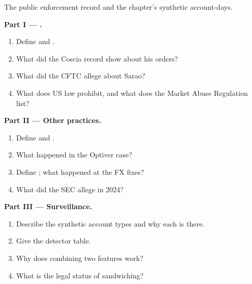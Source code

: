 \begin{problem}\label{pb:s2:manipulative-strategies-and-how-they-are-caught:1}
The public enforcement record and the chapter's synthetic account-days.

\medskip\noindent\textbf{Part I --- .}
\begin{enumerate}
\item Define  and .
\item What did the Coscia record show about his orders?
\item What did the CFTC allege about Sarao?
\item What does US law prohibit, and what does the Market Abuse Regulation list?
\end{enumerate}

\medskip\noindent\textbf{Part II --- Other practices.}
\begin{enumerate}[resume]
\item Define  and .
\item What happened in the Optiver case?
\item Define ; what happened at the FX fixes?
\item What did the SEC allege in 2024?
\end{enumerate}

\medskip\noindent\textbf{Part III --- Surveillance.}
\begin{enumerate}[resume]
\item Describe the synthetic account types and why each is there.
\item Give the detector table.
\item Why does combining two features work?
\item What is the legal status of sandwiching?
\end{enumerate}


\end{problem}
